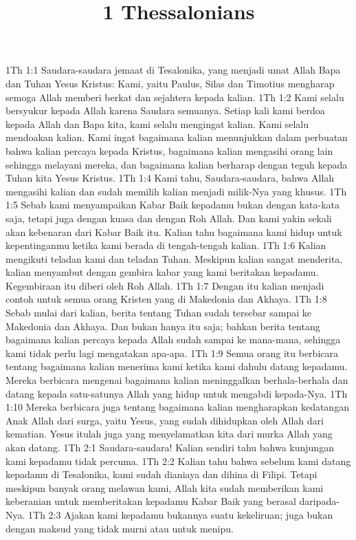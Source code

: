

\title{1 Thessalonians}

1Th 1:1  Saudara-saudara jemaat di Tesalonika, yang menjadi umat Allah Bapa dan Tuhan Yesus Kristus: Kami, yaitu Paulus, Silas dan Timotius mengharap semoga Allah memberi berkat dan sejahtera kepada kalian.
1Th 1:2  Kami selalu bersyukur kepada Allah karena Saudara semuanya. Setiap kali kami berdoa kepada Allah dan Bapa kita, kami selalu mengingat kalian. Kami selalu mendoakan kalian. Kami ingat bagaimana kalian menunjukkan dalam perbuatan bahwa kalian percaya kepada Kristus, bagaimana kalian mengasihi orang lain sehingga melayani mereka, dan bagaimana kalian berharap dengan teguh kepada Tuhan kita Yesus Kristus.
1Th 1:4  Kami tahu, Saudara-saudara, bahwa Allah mengasihi kalian dan sudah memilih kalian menjadi milik-Nya yang khusus.
1Th 1:5  Sebab kami menyampaikan Kabar Baik kepadamu bukan dengan kata-kata saja, tetapi juga dengan kuasa dan dengan Roh Allah. Dan kami yakin sekali akan kebenaran dari Kabar Baik itu. Kalian tahu bagaimana kami hidup untuk kepentinganmu ketika kami berada di tengah-tengah kalian.
1Th 1:6  Kalian mengikuti teladan kami dan teladan Tuhan. Meskipun kalian sangat menderita, kalian menyambut dengan gembira kabar yang kami beritakan kepadamu. Kegembiraan itu diberi oleh Roh Allah.
1Th 1:7  Dengan itu kalian menjadi contoh untuk semua orang Kristen yang di Makedonia dan Akhaya.
1Th 1:8  Sebab mulai dari kalian, berita tentang Tuhan sudah tersebar sampai ke Makedonia dan Akhaya. Dan bukan hanya itu saja; bahkan berita tentang bagaimana kalian percaya kepada Allah sudah sampai ke mana-mana, sehingga kami tidak perlu lagi mengatakan apa-apa.
1Th 1:9  Semua orang itu berbicara tentang bagaimana kalian menerima kami ketika kami dahulu datang kepadamu. Mereka berbicara mengenai bagaimana kalian meninggalkan berhala-berhala dan datang kepada satu-satunya Allah yang hidup untuk mengabdi kepada-Nya.
1Th 1:10  Mereka berbicara juga tentang bagaimana kalian mengharapkan kedatangan Anak Allah dari surga, yaitu Yesus, yang sudah dihidupkan oleh Allah dari kematian. Yesus itulah juga yang menyelamatkan kita dari murka Allah yang akan datang.
1Th 2:1  Saudara-saudara! Kalian sendiri tahu bahwa kunjungan kami kepadamu tidak percuma.
1Th 2:2  Kalian tahu bahwa sebelum kami datang kepadamu di Tesalonika, kami sudah dianiaya dan dihina di Filipi. Tetapi meskipun banyak orang melawan kami, Allah kita sudah memberikan kami keberanian untuk memberitakan kepadamu Kabar Baik yang berasal daripada-Nya.
1Th 2:3  Ajakan kami kepadamu bukannya suatu kekeliruan; juga bukan dengan maksud yang tidak murni atau untuk menipu.
